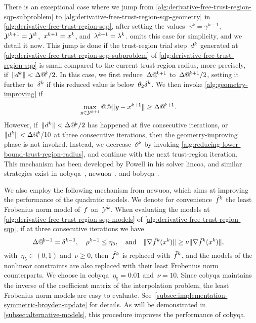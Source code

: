 There is an exceptional case where we jump from \cref{alg:derivative-free-trust-region-sqp-subproblem} to \cref{alg:derivative-free-trust-region-sqp-geometry} in \cref{alg:derivative-free-trust-region-sqp}, after setting the values~$\gamma^k = \gamma^{k - 1}$,~$\xpt[k + 1] = \xpt[k]$,~$\iter[k + 1] = \iter[k]$, and~$\lm[k + 1] = \lm[k]$.
 omits this case for simplicity, and we detail it now.
This jump is done if the trust-region trial step~$\step[k]$ generated at \cref{alg:derivative-free-trust-region-sqp-subproblem} of \cref{alg:derivative-free-trust-region-sqp} is small compared to the current trust-region radius, more precisely, if~$\norm{\step[k]} < \rad[k] / 2$.
In this case, we first reduce~$\rad[k + 1]$ to~$\rad[k + 1] / 2$, setting it further to~$\radlb[k]$ if this reduced value is below~$\theta_2 \radlb[k]$.
We then invoke \cref{alg:geometry-improving} if
\begin{equation*}
    \max_{y \in \xpt[k + 1]} @@ \norm{y - \iter[k + 1]} \ge \rad[k + 1].
\end{equation*}
However, if~$\norm{\step[k]} < \rad[k] / 2$ has happened at five consecutive iterations, or~$\norm{\step[k]} < \rad[k] / 10$ at three consecutive iterations, then the geometry-improving phase is not invoked.
Instead, we decrease~$\radlb[k]$ by invoking \cref{alg:reducing-lower-bound-trust-region-radius}, and continue with the next trust-region iteration.
This mechanism has been developed by Powell in his solver \gls{lincoa}, and similar strategies exist in \gls{uobyqa}~\cite{Powell_2002}, \gls{newuoa}~\cite{Powell_2006}, and \gls{bobyqa}~\cite{Powell_2009}.

We also employ the following mechanism from \gls{newuoa}, which aims at improving the performance of the quadratic models.
We denote for convenience~$\objmalt[k]$ the least Frobenius norm model of~$f$ on~$\xpt[k]$.
When evaluating the models at \cref{alg:derivative-free-trust-region-sqp-models} of \cref{alg:derivative-free-trust-region-sqp}, if at three consecutive iterations we have
\begin{equation*}
    \rad[k - 1] = \radlb[k - 1], \quad \ratio[k - 1] \le \eta_5, \quad \text{and} \quad \norm{\nabla \objm[k](\iter[k])} \ge \nu \norm{\nabla \objmalt[k](\iter[k])},
\end{equation*}
with~$\eta_5 \in (0, 1)$ and~$\nu \ge 0$, then~$\objm[k]$ is replaced with~$\objmalt[k]$, and the models of the nonlinear constraints are also replaced with their least Frobenius norm counterparts.
We choose in \gls{cobyqa}~$\eta_5 = 0.01$ and~$\nu = 10$.
Since \gls{cobyqa} maintains the inverse of the coefficient matrix of the interpolation problem, the least Frobenius norm models are easy to evaluate.
See~\cref{subsec:implementation-symmetric-broyden-update} for details.
As will be demonstrated in \cref{subsec:alternative-models}, this procedure improves the performance of \gls{cobyqa}.

